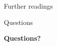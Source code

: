 \appendix
\section{\appendixname}

\begin{frame}{Further readings}
\nocite{*}
 

\end{frame}

\begin{frame}{Questions}
  \begin{center}
    \Huge\bf
    Questions?
  \end{center}
\end{frame}
